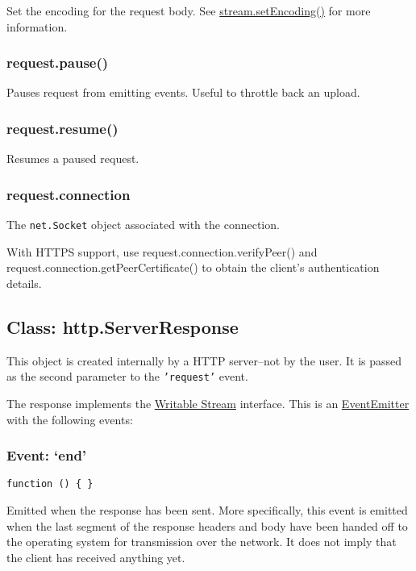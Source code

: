 Set the encoding for the request body. See
\href{stream.html\#stream\_stream\_setencoding\_encoding}{stream.setEncoding()}
for more information.

\subsubsection{request.pause()}

Pauses request from emitting events. Useful to throttle back an upload.

\subsubsection{request.resume()}

Resumes a paused request.

\subsubsection{request.connection}

The \texttt{net.Socket} object associated with the connection.

With HTTPS support, use request.connection.verifyPeer() and
request.connection.getPeerCertificate() to obtain the client's
authentication details.

\subsection{Class: http.ServerResponse}

This object is created internally by a HTTP server--not by the user. It
is passed as the second parameter to the \texttt{'request'} event.

The response implements the
\href{stream.html\#stream\_writable\_stream}{Writable Stream} interface.
This is an
\href{events.html\#events\_class\_events\_eventemitter}{EventEmitter}
with the following events:

\subsubsection{Event: `end'}

\texttt{function () \{ \}}

Emitted when the response has been sent. More specifically, this event
is emitted when the last segment of the response headers and body have
been handed off to the operating system for transmission over the
network. It does not imply that the client has received anything yet.

